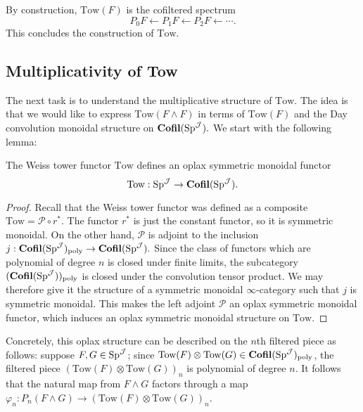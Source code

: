 \begin{cnstr}
By construction, $\text{Tow}(F)$ is the cofiltered spectrum $$P_0 F\longleftarrow P_1 F \longleftarrow P_2 F \longleftarrow \cdots .$$  This concludes the construction of $\text{Tow}.$
\end{cnstr}

\subsection{Multiplicativity of Tow}
The next task is to understand the multiplicative structure of $\text{Tow}$.  The idea is that we would like to express $\text{Tow}(F\wedge F)$ in terms of $\text{Tow}(F)$ and the Day convolution monoidal structure on $\operatorname{\mathbf{Cofil}}(\operatorname{\mathrm{Sp}}^{\operatorname{\mathcal{J}}}).$  We start with the following lemma:  

\begin{lem}
The Weiss tower functor $\text{Tow}$ defines an oplax symmetric monoidal functor $$\text{Tow}: \operatorname{\mathrm{Sp}}^{\operatorname{\mathcal{J}}} \to \operatorname{\mathbf{Cofil}}(\operatorname{\mathrm{Sp}}^{\operatorname{\mathcal{J}}}).$$
\end{lem}
\begin{proof}
Recall that the Weiss tower functor was defined as a composite $\text{Tow} = \mathcal{P} \circ r^*.$  The functor $r^*$ is just the constant functor, so it is symmetric monoidal.  On the other hand, $\mathcal{P}$ is adjoint to the inclusion $j: \operatorname{\mathbf{Cofil}}(\operatorname{\mathrm{Sp}}^{\operatorname{\mathcal{J}}})_{\text{poly}} \to \operatorname{\mathbf{Cofil}}(\operatorname{\mathrm{Sp}}^{\operatorname{\mathcal{J}}}).$  Since the class of functors which are polynomial of degree $n$ is closed under finite limits, the subcategory $(\operatorname{\mathbf{Cofil}}(\operatorname{\mathrm{Sp}}^{\operatorname{\mathcal{J}}}))_{\text{poly}}$ is closed under the convolution tensor product.  We may therefore give it the structure of a symmetric monoidal $\infty$-category such that $j$ is symmetric monoidal.  This makes the left adjoint $\mathcal{P}$ an oplax symmetric monoidal functor, which induces an oplax symmetric monoidal structure on $\text{Tow}.$  \end{proof}

Concretely, this oplax structure can be described on the $n$th filtered piece as follows: suppose $F,G \in \operatorname{\mathrm{Sp}}^{\operatorname{\mathcal{J}}}$; since $\text{Tow}(F) \otimes \text{Tow}(G) \in  \operatorname{\mathbf{Cofil}}(\operatorname{\mathrm{Sp}}^{\operatorname{\mathcal{J}}})_{\text{poly}}$, the filtered piece $(\text{Tow}(F) \otimes \text{Tow}(G))_n$ is polynomial of degree $n$.  It follows that the natural map from $F\wedge G$ factors through a map $\varphi_n: P_n(F\wedge G)\to (\text{Tow}(F) \otimes \text{Tow}(G))_n$.  

